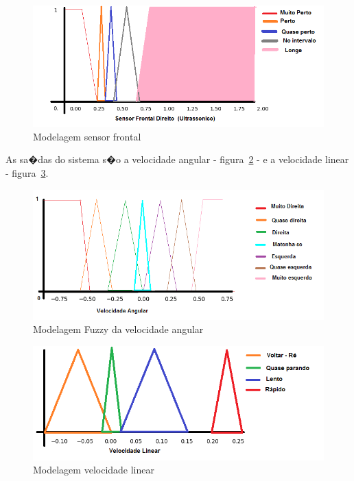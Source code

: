 \documentclass[twoside,conference,a4paper]{IEEEtran}
\begin{document}
\begin{figure}[ht]
\centering
\includegraphics[width=1\hsize]{images/sensor-wall-follow-model.png}
\caption{Modelagem sensor frontal}
\label{fig:fig5}
\end{figure}

As sa�das do sistema s�o a velocidade angular - figura~\ref{fig:fig6} - e a velocidade linear - figura~\ref{fig:fig7}. 

\begin{figure}[ht]
\centering
\includegraphics[width=1\hsize]{images/velocidade-angular-saida.png}
\caption{Modelagem Fuzzy da velocidade angular}
\label{fig:fig6}
\end{figure}

\begin{figure}[ht]
\centering
\includegraphics[width=1\hsize]{images/velocidade-linear-saida.png}
\caption{Modelagem velocidade linear}
\label{fig:fig7}
\end{figure}
\end{document}
